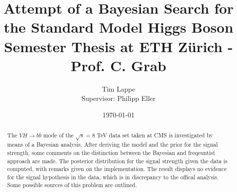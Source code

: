 \documentclass[aps,prb,twocolumn,showpacs,superscriptaddress,groupedaddress]{revtex4}  %
\begin{document}
\widetext



\title{Attempt of a Bayesian Search for the Standard Model Higgs Boson\\
\textnormal{\small{Semester Thesis at ETH Z\"urich - Prof. C. Grab}}}
\date{\today}
\author{Tim Lappe\\
\small{Supervisor: Philipp Eller}}


\begin{abstract}
The $VH \rightarrow b\overline{b}$ mode of the $\sqrt{s}=8$ TeV data set taken at CMS is investigated by means of a Bayesian analysis. After deriving the model and the prior for the signal strength, some comments on the distinction between the Bayesian and freqeuntist approach are made. The posterior distribution for the signal strength given the data is computed, with remarks given on the implementation. The result displays no evidence for the signal hypothesis in the data, which is in discrepancy to the offical analysis. Some possible sources of this problem are outlined.
\end{abstract}


\maketitle
\end{document}
